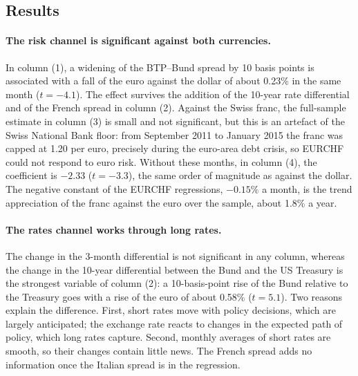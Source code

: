 \subsection{Results}

\begin{table}[h]
\centering
\footnotesize

\caption{Regressions of the monthly percentage change of the euro on the changes in rate differentials and sovereign spreads (percentage points), February 1999 -- August 2026. $t$-statistics with Newey--West standard errors (5 lags) in parentheses. Column (4) excludes the period of the Swiss National Bank floor on EURCHF (September 2011 -- January 2015). Generated by \texttt{scripts/euro\_drivers.py}.}
\label{tab:euro}
\end{table}

\paragraph{The risk channel is significant against both currencies.}
In column (1), a widening of the BTP--Bund spread by 10 basis points is associated with a fall of the euro against the dollar of about 0.23\% in the same month ($t = -4.1$).
The effect survives the addition of the 10-year rate differential and of the French spread in column (2).
Against the Swiss franc, the full-sample estimate in column (3) is small and not significant, but this is an artefact of the Swiss National Bank floor: from September 2011 to January 2015 the franc was capped at 1.20 per euro, precisely during the euro-area debt crisis, so EURCHF could not respond to euro risk.
Without these months, in column (4), the coefficient is $-2.33$ ($t = -3.3$), the same order of magnitude as against the dollar.
The negative constant of the EURCHF regressions, $-0.15\%$ a month, is the trend appreciation of the franc against the euro over the sample, about 1.8\% a year.

\paragraph{The rates channel works through long rates.}
The change in the 3-month differential is not significant in any column, whereas the change in the 10-year differential between the Bund and the US Treasury is the strongest variable of column (2): a 10-basis-point rise of the Bund relative to the Treasury goes with a rise of the euro of about 0.58\% ($t = 5.1$).
Two reasons explain the difference.
First, short rates move with policy decisions, which are largely anticipated; the exchange rate reacts to changes in the expected path of policy, which long rates capture.
Second, monthly averages of short rates are smooth, so their changes contain little news.
The French spread adds no information once the Italian spread is in the regression.

